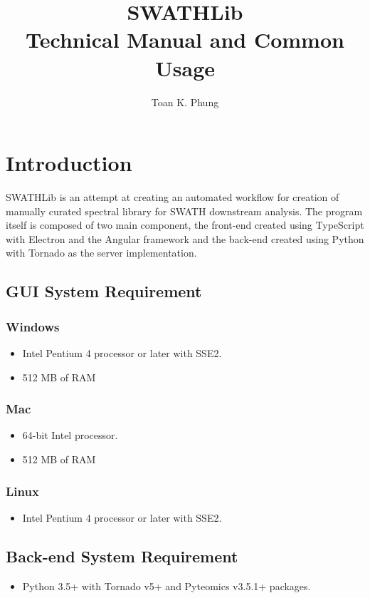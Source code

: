 \documentclass[10pt,a4paper]{memoir}
\title{%
SWATHLib \\
\large Technical Manual and Common Usage}
\author{Toan K. Phung}
\begin{document}
\frontmatter
\maketitle
\clearpage
\tableofcontents
\mainmatter
\chapter{Introduction}

SWATHLib is an attempt at creating an automated workflow for creation of manually curated spectral library for SWATH downstream analysis. The program itself is composed of two main component, the front-end created using TypeScript with Electron and the Angular framework and the back-end created using Python with Tornado as the server implementation.
\section{GUI System Requirement}
\subsection{Windows}

\begin{itemize}
	\item Intel Pentium 4 processor or later with SSE2.
	\item 512 MB of RAM
\end{itemize}
\subsection{Mac}
\begin{itemize}
	\item 64-bit Intel processor.
	\item 512 MB of RAM
\end{itemize}
\subsection{Linux}
\begin{itemize}
	\item Intel Pentium 4 processor or later with SSE2.
\end{itemize}
\section{Back-end System Requirement}
\begin{itemize}
	\item Python 3.5+ with Tornado v5+ and Pyteomics v3.5.1+ packages.
\end{itemize}
\clearpage
\end{document}

